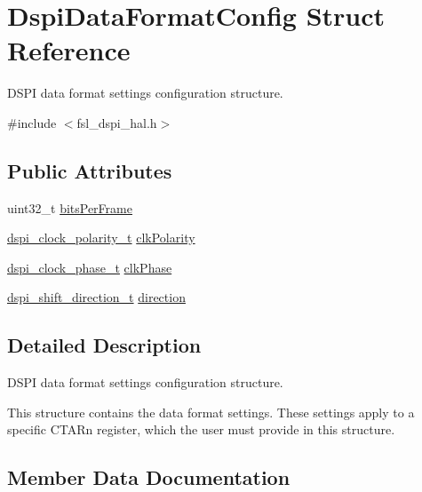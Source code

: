 \hypertarget{structDspiDataFormatConfig}{}\section{Dspi\+Data\+Format\+Config Struct Reference}
\label{structDspiDataFormatConfig}


D\+S\+PI data format settings configuration structure.  




{\ttfamily \#include $<$fsl\+\_\+dspi\+\_\+hal.\+h$>$}

\subsection*{Public Attributes}
\begin{DoxyCompactItemize}
\item 
uint32\+\_\+t \hyperlink{structDspiDataFormatConfig_ac63c29bae9be526eb82eb9188a3685d4}{bits\+Per\+Frame}
\item 
\hyperlink{group__dspi__hal_ga959b683effa08cff187f755506526745}{dspi\+\_\+clock\+\_\+polarity\+\_\+t} \hyperlink{structDspiDataFormatConfig_a6351c261cb1ec33e415c3cfe5118acb9}{clk\+Polarity}
\item 
\hyperlink{group__dspi__hal_gace26aa668a9601c9d79bdd5205f37b14}{dspi\+\_\+clock\+\_\+phase\+\_\+t} \hyperlink{structDspiDataFormatConfig_a6a28276cf9ea7163033dc4d69a6162ff}{clk\+Phase}
\item 
\hyperlink{group__dspi__hal_ga536388ab9d8d1b88f7d112a83b769366}{dspi\+\_\+shift\+\_\+direction\+\_\+t} \hyperlink{structDspiDataFormatConfig_ad0c3a440790fa062778dfa1f4ca48175}{direction}
\end{DoxyCompactItemize}


\subsection{Detailed Description}
D\+S\+PI data format settings configuration structure. 

This structure contains the data format settings. These settings apply to a specific C\+T\+A\+Rn register, which the user must provide in this structure. 

\subsection{Member Data Documentation}
